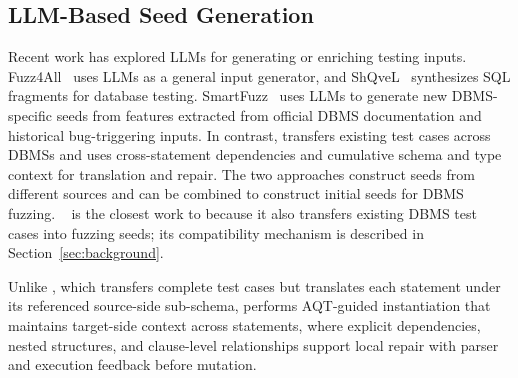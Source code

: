 \documentclass[conference]{IEEEtran}
\begin{document}
\subsection{LLM-Based Seed Generation}
Recent work has explored LLMs for generating or enriching testing inputs.
Fuzz4All~\cite{xia2024fuzz4all} uses LLMs as a general input generator, and ShQveL~\cite{zhong2025testing} synthesizes SQL fragments for database testing.
SmartFuzz~\cite{lin2026smartfuzz} uses LLMs to generate new DBMS-specific seeds from features extracted from official DBMS documentation and historical bug-triggering inputs.
In contrast, \tool{} transfers existing test cases across DBMSs and uses cross-statement dependencies and cumulative schema and type context for translation and repair.
The two approaches construct seeds from different sources and can be combined to construct initial seeds for DBMS fuzzing.
\sedar{}~\cite{fu2024sedar} is the closest work to \tool{} because it also transfers existing DBMS test cases into fuzzing seeds; its compatibility mechanism is described in Section~\ref{sec:background}.

Unlike \sedar{}, which transfers complete test cases but translates each statement under its referenced source-side sub-schema, \tool{} performs AQT-guided instantiation that maintains target-side context across statements, where explicit dependencies, nested structures, and clause-level relationships support local repair with parser and execution feedback before mutation.


\end{document}

